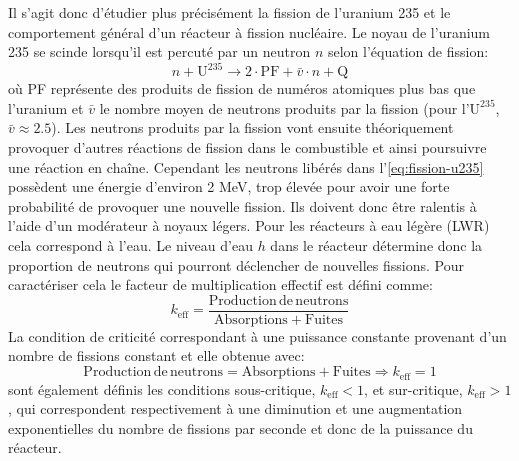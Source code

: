 Il s'agit donc d'étudier plus précisément la fission de l'uranium 235 et le comportement général d'un réacteur à fission nucléaire. Le noyau de l'uranium 235 se scinde lorsqu'il est percuté par un neutron $n$ selon l'équation de fission:
\begin{equation}
    n + \mathrm{U}^{235} \to 2\cdot \mathrm{PF} + \bar{v} \cdot n + \mathrm{Q}
    \label{eq:fission-u235}
\end{equation}
où PF représente des produits de fission de numéros atomiques plus bas que l'uranium et $\bar{v}$ le nombre moyen de neutrons produits par la fission (pour l'$\mathrm{U}^{235}$, $\bar{v} \approx 2.5$). Les neutrons produits par la fission vont ensuite théoriquement provoquer d'autres réactions de fission dans le combustible et ainsi poursuivre une réaction en chaîne. Cependant les neutrons libérés dans l'\autoref{eq:fission-u235} possèdent une énergie d'environ 2 \si{\mega\electronvolt}, trop élevée pour avoir une forte probabilité de provoquer une nouvelle fission. Ils doivent donc être ralentis à l'aide d'un modérateur à noyaux légers. Pour les réacteurs à eau légère (LWR) cela correspond à l'eau. Le niveau d'eau $h$ dans le réacteur détermine donc la proportion de neutrons qui pourront déclencher de nouvelles fissions. Pour caractériser cela le facteur de multiplication effectif est défini comme:
\begin{equation}
    k_\mathrm{eff} = \frac{\mathrm{Production \, de \, neutrons}}{\mathrm{Absorptions} + \mathrm{Fuites}}
\end{equation}
La condition de criticité correspondant à une puissance constante provenant d'un nombre de fissions constant et elle obtenue avec:
\begin{equation}
    \mathrm{Production \, de \, neutrons} = \mathrm{Absorptions} + \mathrm{Fuites} \Rightarrow k_\mathrm{eff} = 1
\end{equation}
sont également définis les conditions sous-critique, $k_\mathrm{eff} < 1$, et sur-critique, $k_\mathrm{eff}>1$, qui correspondent respectivement à une diminution et une augmentation exponentielles du nombre de fissions par seconde et donc de la puissance du réacteur.

